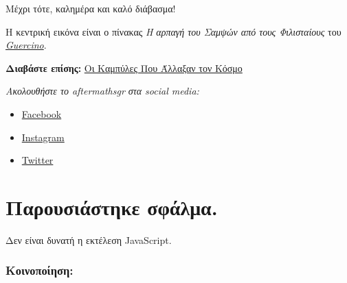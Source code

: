 \documentclass[
]{article}
\providecommand{\tightlist}{%
  \setlength{\itemsep}{0pt}\setlength{\parskip}{0pt}}
\begin{document}
Μέχρι τότε, καλημέρα και καλό διάβασμα!

Η κεντρική εικόνα είναι ο πίνακας \emph{Η αρπαγή του Σαμψών από τους
Φιλισταίους} του
\emph{\href{https://en.wikipedia.org/wiki/Guercino}{Guercino}}.

\textbf{Διαβάστε επίσης:}
\href{https://aftermathsgr.wordpress.com/2024/07/23/\%ce\%bf\%ce\%b9-\%ce\%ba\%ce\%b1\%ce\%bc\%cf\%80\%cf\%8d\%ce\%bb\%ce\%b5\%cf\%82-\%cf\%80\%ce\%bf\%cf\%85-\%ce\%ac\%ce\%bb\%ce\%bb\%ce\%b1\%ce\%be\%ce\%b1\%ce\%bd-\%cf\%84\%ce\%bf\%ce\%bd-\%ce\%ba\%cf\%8c\%cf\%83\%ce\%bc\%ce\%bf/}{Οι
Καμπύλες Που Άλλαξαν τον Κόσμο}

\emph{Ακολουθήστε το aftermathsgr στα social media:}

\begin{itemize}
\tightlist
\item
  \href{https://www.facebook.com/aftermaths.gr/}{{Facebook}}
\item
  \href{https://www.instagram.com/aftermathsgr/}{{Instagram}}
\item
  \href{https://twitter.com/aftermathsgr}{{Twitter}}
\end{itemize}

\hypertarget{player}{}

\hypertarget{ux3c0ux3b1ux3c1ux3bfux3c5ux3c3ux3b9ux3acux3c3ux3c4ux3b7ux3baux3b5-ux3c3ux3c6ux3acux3bbux3bcux3b1.}{%
\section{Παρουσιάστηκε
σφάλμα.}\label{ux3c0ux3b1ux3c1ux3bfux3c5ux3c3ux3b9ux3acux3c3ux3c4ux3b7ux3baux3b5-ux3c3ux3c6ux3acux3bbux3bcux3b1.}}

Δεν είναι δυνατή η εκτέλεση JavaScript.

\protect\hypertarget{wordads-inline-marker}{}{}

\hypertarget{jp-post-flair}{}
\hypertarget{ux3baux3bfux3b9ux3bdux3bfux3c0ux3bfux3afux3b7ux3c3ux3b7}{%
\subsubsection{Κοινοποίηση:}\label{ux3baux3bfux3b9ux3bdux3bfux3c0ux3bfux3afux3b7ux3c3ux3b7}}
\end{document}
